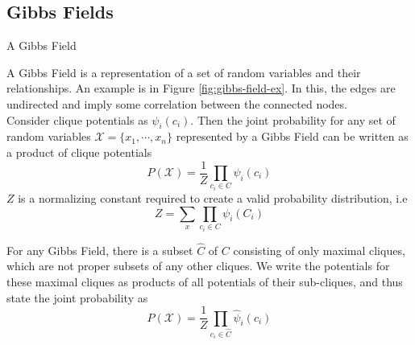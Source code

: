 \subsection{Gibbs Fields}
\begin{marginfigure}
\centering
{}
\caption{A Gibbs Field}
\label{fig:gibbs-field-ex}
\end{marginfigure}
A Gibbs Field is a representation of a set of random variables and their relationships. An example is in Figure \ref{fig:gibbs-field-ex}. In this, the edges are undirected and imply some correlation between the connected nodes. \\
Consider clique potentials as $\psi_i(c_i)$. Then the joint probability for any set of random variables $\mathcal{X} = \{x_1, \cdots, x_n\}$ represented by a Gibbs Field can be written as a product of clique potentials
\begin{equation}
P(\mathcal X) = \dfrac{1}{Z} \prod_{c_i \in C} \psi_i(c_i)
\end{equation}
$Z$ is a normalizing constant required to create a valid probability distribution, i.e
\begin{equation}
Z = \sum_x \prod_{c_i \in C}\psi_i(C_i)
\end{equation}
\begin{rem}
For any Gibbs Field, there is a subset $\hat{C}$ of $C$ consisting of only maximal cliques, which are not proper subsets of any other cliques. We write the potentials for these maximal cliques as products of all potentials of their sub-cliques, and thus state the joint probability as
\begin{equation}
	P(\mathcal X) = \dfrac{1}{Z}\prod_{c_i \in \hat C} \hat{\psi}_i(c_i)
\end{equation}
\end{rem}
